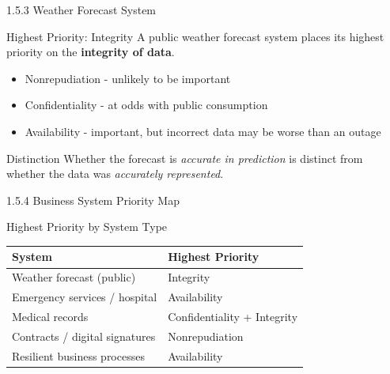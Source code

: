 \documentclass{beamer}
\begin{document}
	\begin{frame}{1.5.3 Weather Forecast System}
		\begin{block}{Highest Priority: Integrity}
			A public weather forecast system places its highest priority on the \textbf{integrity of data}.
		\end{block}
		\begin{itemize}
			\item Nonrepudiation - unlikely to be important
			\item Confidentiality - at odds with public consumption
			\item Availability - important, but incorrect data may be worse than an outage
		\end{itemize}
		\begin{exampleblock}{Distinction}
			Whether the forecast is \textit{accurate in prediction} is distinct from whether the data was \textit{accurately represented}.
		\end{exampleblock}
	\end{frame}
	
	\begin{frame}{1.5.4 Business System Priority Map}
		\begin{block}{Highest Priority by System Type}
			\begin{tabular}{|p{5cm}|p{3.5cm}|}
				\hline
				\textbf{System} & \textbf{Highest Priority} \\
				\hline
				Weather forecast (public) & Integrity \\
				\hline
				Emergency services / hospital & Availability \\
				\hline
				Medical records & Confidentiality + Integrity \\
				\hline
				Contracts / digital signatures & Nonrepudiation \\
				\hline
				Resilient business processes & Availability \\
				\hline
			\end{tabular}
		\end{block}
	\end{frame}
	
\end{document}
